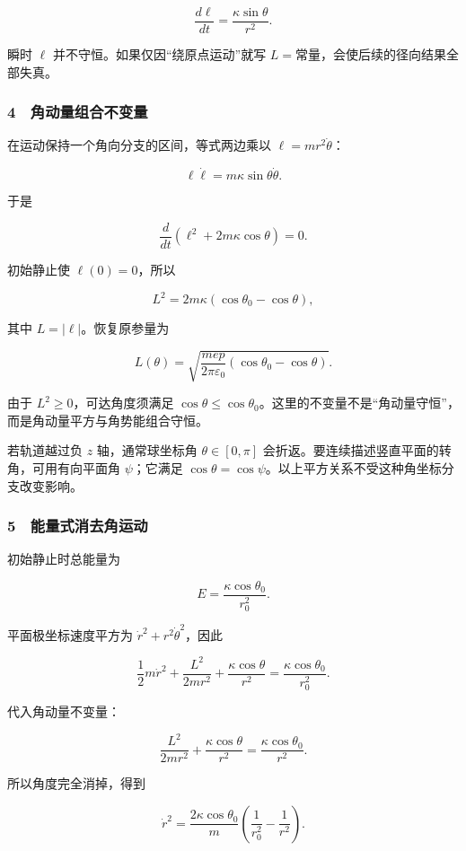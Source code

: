 \documentclass[12pt,a4paper,fontset=fandol]{ctexart}
\begin{document}
\[\frac{d\ell}{dt}=\frac{\kappa\sin\theta}{r^2}.\]

瞬时 \(\ell\) 并不守恒。如果仅因``绕原点运动''就写
\(L=\)常量，会使后续的径向结果全部失真。

\subsubsection{4　角动量组合不变量}\label{ux89d2ux52a8ux91cfux7ec4ux5408ux4e0dux53d8ux91cf}

在运动保持一个角向分支的区间，等式两边乘以 \(\ell=mr^2\dot\theta\)：

\[\ell\dot\ell=m\kappa\sin\theta\dot\theta.\]

于是

\[\frac{d}{dt}\left(\ell^2+2m\kappa\cos\theta\right)=0.\]

初始静止使 \(\ell(0)=0\)，所以

\[\boxed{L^2=2m\kappa(\cos\theta_0-\cos\theta),}\]

其中 \(L=|\ell|\)。恢复原参量为

\[\boxed{L(\theta)=
\sqrt{\frac{mep}{2\pi\varepsilon_0}
(\cos\theta_0-\cos\theta)}.}\]

由于 \(L^2\ge0\)，可达角度须满足
\(\cos\theta\le\cos\theta_0\)。这里的不变量不是``角动量守恒''，而是角动量平方与角势能组合守恒。

若轨道越过负 \(z\) 轴，通常球坐标角 \(\theta\in[0,\pi]\)
会折返。要连续描述竖直平面的转角，可用有向平面角 \(\psi\)；它满足
\(\cos\theta=\cos\psi\)。以上平方关系不受这种角坐标分支改变影响。

\subsubsection{5　能量式消去角运动}\label{ux80fdux91cfux5f0fux6d88ux53bbux89d2ux8fd0ux52a8}

初始静止时总能量为

\[E=\frac{\kappa\cos\theta_0}{r_0^2}.\]

平面极坐标速度平方为 \(\dot r^2+r^2\dot\theta^2\)，因此

\[\frac12m\dot r^2+\frac{L^2}{2mr^2}
+\frac{\kappa\cos\theta}{r^2}
=\frac{\kappa\cos\theta_0}{r_0^2}.\]

代入角动量不变量：

\[\frac{L^2}{2mr^2}+\frac{\kappa\cos\theta}{r^2}
=\frac{\kappa\cos\theta_0}{r^2}.\]

所以角度完全消掉，得到

\[\boxed{\dot r^2=\frac{2\kappa\cos\theta_0}{m}
\left(\frac1{r_0^2}-\frac1{r^2}\right).}\]
\end{document}
